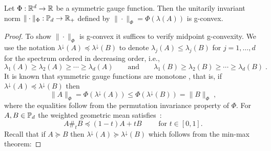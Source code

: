 \documentclass[sn-nature]{sn-jnl}%
\theoremstyle{thmstyleone}%
\theoremstyle{thmstyletwo}%
\theoremstyle{thmstylethree}%
\begin{document}
    \begin{prop}
        Let $\Phi: \mathbb{R}^d \to \mathbb{R}$ be a symmetric gauge function. Then the unitarily invariant norm $\|\cdot\|_\Phi: \mathbb{P}_d \to \mathbb{R}_+$ defined by $\|\cdot\|_\Phi = \Phi(\lambda(A))$ is g-convex.
    \end{prop}


\begin{proof}     
    To show $\|\cdot\|_\Phi$ is g-convex it suffices to verify midpoint g-convexity. We use the notation $\lambda^\downarrow(A) \preceq \lambda^\downarrow(B)$ to denote $\lambda_j(A) \leq \lambda_j(B)$ for $j = 1, \ldots, d$ for the spectrum ordered in decreasing order, i.e., 
    \[
    \lambda_1(A) \geq \lambda_2(A) \geq \cdots \geq \lambda_d(A) \qquad \text{and} \qquad \lambda_1(B) \geq \lambda_2(B) \geq \cdots \geq \lambda_d(B) \; .
    \]
    It is known that symmetric gauge functions are monotone \cite{bhatia97}, that is, if $\lambda^\downarrow(A) \preceq \lambda^\downarrow(B)$  then 
    \[
    \|A\|_\Phi = \Phi(\lambda^\downarrow(A)) \leq \Phi(\lambda^\downarrow(B)) = \|B\|_\Phi \; ,
    \]
    where the equalities follow from the permutation invariance property of $\Phi$.
    For $A, B \in \mathbb{P}_d$ the weighted geometric mean satisfies~\cite[Exercise 6.5.6]{bhatia07positivedefinitematrices}: 
    \[
    A \#_t B \preceq (1-t) A+t B \qquad \text { for } t \in[0,1].
    \]
    Recall that if $A \succeq B$ then $\lambda^\downarrow(A) \succeq \lambda^\downarrow(B)$ which follows from the min-max theorem:


\end{proof}
\end{document}
